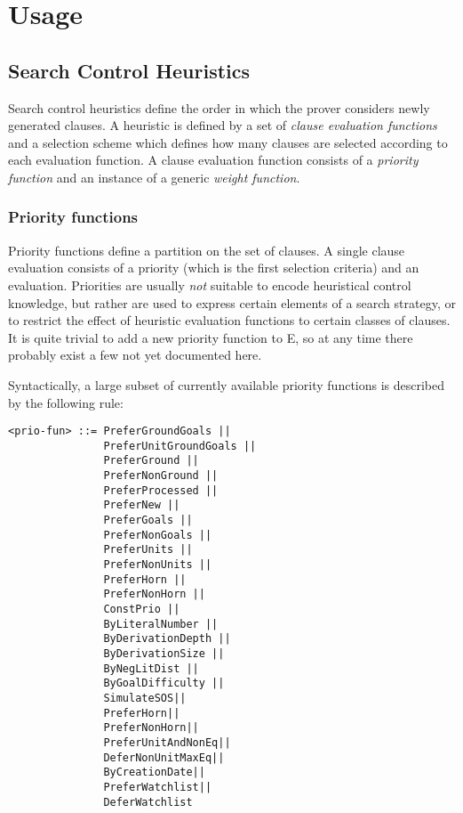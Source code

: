 \documentclass{article}
\begin{document}
\section{Usage}
\label{sec:options}


\subsection{Search Control Heuristics}
\label{sec:options:heuristics}

Search control heuristics define the order in which the prover
considers newly generated clauses. A heuristic is defined by a set of
\emph{clause evaluation functions} and a selection scheme which defines
how many clauses are selected according to each evaluation function. A
clause evaluation function consists of a \emph{priority function} and
an instance of a generic \emph{weight function}.

\subsubsection{Priority functions}

Priority functions define a partition on the set of clauses.  A single
clause evaluation consists of a priority (which is the first selection
criteria) and an evaluation. Priorities are usually \emph{not} suitable
to encode heuristical control knowledge, but rather are used to
express certain elements of a search strategy, or to restrict the
effect of heuristic evaluation functions to certain classes of
clauses. It is quite trivial to add a new priority function to E, so
at any time there probably exist a few not yet documented here.

Syntactically, a large subset of currently available priority
functions is described by the following rule:

\begin{verbatim}
<prio-fun> ::= PreferGroundGoals ||
               PreferUnitGroundGoals ||
               PreferGround ||
               PreferNonGround ||
               PreferProcessed ||
               PreferNew ||
               PreferGoals ||
               PreferNonGoals ||
               PreferUnits ||
               PreferNonUnits ||
               PreferHorn ||
               PreferNonHorn ||
               ConstPrio ||
               ByLiteralNumber ||
               ByDerivationDepth ||
               ByDerivationSize ||
               ByNegLitDist ||
               ByGoalDifficulty ||
               SimulateSOS||
               PreferHorn||
               PreferNonHorn||
               PreferUnitAndNonEq||
               DeferNonUnitMaxEq||
               ByCreationDate||
               PreferWatchlist||
               DeferWatchlist
\end{verbatim}
\end{document}

